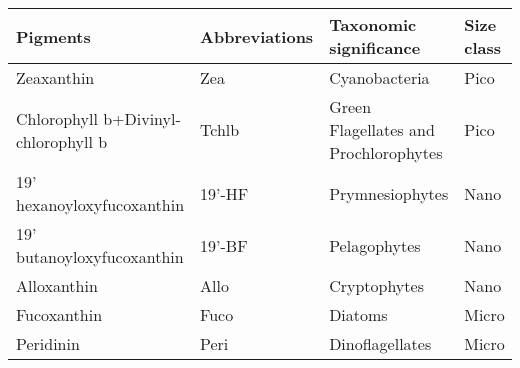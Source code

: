 \captionsetup[table]{labelformat=empty,skip=1pt}
\begin{longtable}{llll}
\toprule
Pigments & Abbreviations & Taxonomic significance & Size class \\ 
\midrule
Zeaxanthin & Zea & Cyanobacteria & Pico \\ 
Chlorophyll b+Divinyl-chlorophyll b & Tchlb & Green Flagellates and Prochlorophytes & Pico \\ 
19' hexanoyloxyfucoxanthin & 19'-HF & Prymnesiophytes & Nano \\ 
19' butanoyloxyfucoxanthin & 19'-BF & Pelagophytes & Nano \\ 
Alloxanthin & Allo & Cryptophytes & Nano \\ 
Fucoxanthin & Fuco & Diatoms & Micro \\ 
Peridinin & Peri & Dinoflagellates & Micro \\ 
\bottomrule
\end{longtable}

